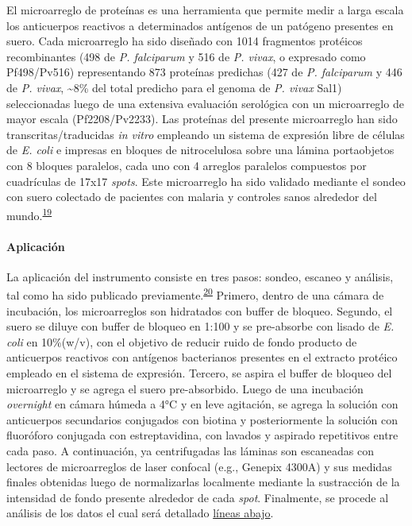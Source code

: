 \documentclass[]{article}
\let\oldparagraph\paragraph
\renewcommand{\paragraph}[1]{\oldparagraph{#1}\mbox{}}
\begin{document}
El microarreglo de proteínas es una herramienta que permite medir a
larga escala los anticuerpos reactivos a determinados antígenos de un
patógeno presentes en suero. Cada microarreglo ha sido diseñado con 1014
fragmentos protéicos recombinantes (498 de \emph{P. falciparum} y 516 de
\emph{P. vivax}, o expresado como Pf498/Pv516) representando 873
proteínas predichas (427 de \emph{P. falciparum} y 446 de \emph{P.
vivax}, \textasciitilde{}8\% del total predicho para el genoma de
\emph{P. vivax} Sal1) seleccionadas luego de una extensiva evaluación
serológica con un microarreglo de mayor escala (Pf2208/Pv2233). Las
proteínas del presente microarreglo han sido transcritas/traducidas
\emph{in vitro} empleando un sistema de expresión libre de células de
\emph{E. coli} e impresas en bloques de nitrocelulosa sobre una lámina
portaobjetos con 8 bloques paralelos, cada uno con 4 arreglos paralelos
compuestos por cuadrículas de 17x17 \emph{spots}. Este microarreglo ha
sido validado mediante el sondeo con suero colectado de pacientes con
malaria y controles sanos alrededor del
mundo.\textsuperscript{\protect\hyperlink{ref-King2015FOC}{19}}

\paragraph{Aplicación}\label{aplicacion}

La aplicación del instrumento consiste en tres pasos: sondeo, escaneo y
análisis, tal como ha sido publicado
previamente.\textsuperscript{\protect\hyperlink{ref-Driguez2015}{20}}
Primero, dentro de una cámara de incubación, los microarreglos son
hidratados con buffer de bloqueo. Segundo, el suero se diluye con buffer
de bloqueo en 1:100 y se pre-absorbe con lisado de \emph{E. coli} en
10\%(w/v), con el objetivo de reducir ruido de fondo producto de
anticuerpos reactivos con antígenos bacterianos presentes en el extracto
protéico empleado en el sistema de expresión. Tercero, se aspira el
buffer de bloqueo del microarreglo y se agrega el suero pre-absorbido.
Luego de una incubación \emph{overnight} en cámara húmeda a 4°C y en
leve agitación, se agrega la solución con anticuerpos secundarios
conjugados con biotina y posteriormente la solución con fluoróforo
conjugada con estreptavidina, con lavados y aspirado repetitivos entre
cada paso. A continuación, ya centrifugadas las láminas son escaneadas
con lectores de microarreglos de laser confocal (e.g., Genepix 4300A) y
sus medidas finales obtenidas luego de normalizarlas localmente mediante
la sustracción de la intensidad de fondo presente alrededor de cada
\emph{spot}. Finalmente, se procede al análisis de los datos el cual
será detallado \protect\hyperlink{procanal}{líneas abajo}.
\end{document}
